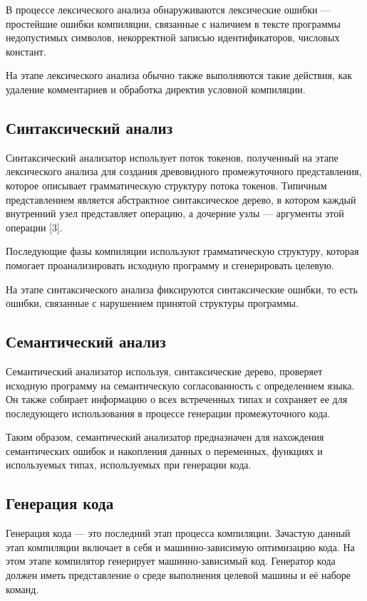 В процессе лексического анализа обнаруживаются лексические ошибки — простейшие ошибки компиляции, связанные с наличием в тексте программы недопустимых символов, некорректной записью идентификаторов, числовых констант.

На этапе лексического анализа обычно также выполняются такие действия, как удаление комментариев и обработка директив условной компиляции.

\subsection{Синтаксический анализ}

Синтаксический анализатор использует поток токенов, полученный на этапе лексического анализа для создания древовидного промежуточного представления, которое описывает грамматическую структуру потока токенов.
Типичным представлением является абстрактное синтаксическое дерево, в котором каждый внутренний узел представляет операцию, а дочерние узлы — аргументы этой операции [3].

Последующие фазы компиляции используют грамматическую структуру, которая помогает проанализировать исходную программу и сгенерировать целевую.

На этапе синтаксического анализа фиксируются синтаксические ошибки, то есть ошибки, связанные с нарушением принятой структуры программы.

\subsection{Семантический анализ}

Семантический анализатор используя, синтаксические дерево, проверяет исходную программу на семантическую согласованность с определением языка.
Он также собирает информацию о всех встреченных типах и сохраняет ее для последующего использования в процессе генерации промежуточного кода.

Таким образом, семантический анализатор предназначен для нахождения семантических ошибок и накопления данных о переменных, функциях и используемых типах, используемых при генерации кода.

\subsection{Генерация кода}

Генерация кода — это последний этап процесса компиляции.
Зачастую данный этап компиляции включает в себя и машинно-зависимую оптимизацию кода.
На этом этапе компилятор генерирует машинно-зависимый код.
Генератор кода должен иметь представление о среде выполнения целевой машины и её наборе команд.

